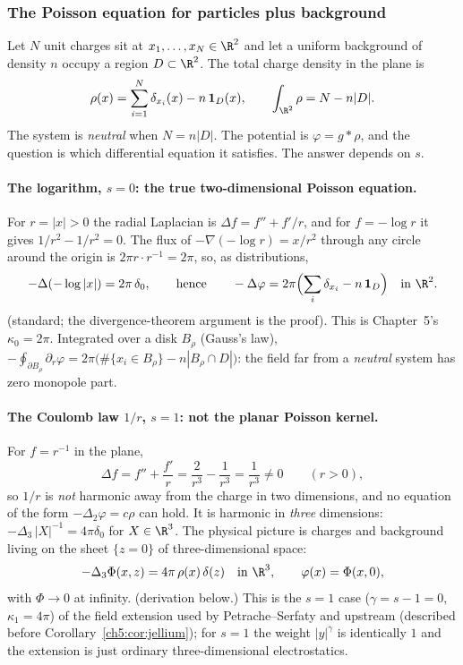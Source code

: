\subsubsection{The Poisson equation for particles plus background}\label{jel:poisson}

Let $N$ unit charges sit at $x_1,\dots,x_N\in\R^2$ and let a uniform background of density $n$ occupy a region
$D\subset\R^2$. The total charge density in the plane is
\begin{equation}\label{jel:eq:rho}
\rho(x)=\sum_{i=1}^N\delta_{x_i}(x)-n\,\mathbf 1_D(x),\qquad \int_{\R^2}\rho=N-n|D| .
\end{equation}
The system is \emph{neutral} when $N=n|D|$. The potential is $\varphi=g*\rho$, and the question is which differential
equation it satisfies. The answer depends on $s$.

\paragraph{The logarithm, $s=0$: the true two-dimensional Poisson equation.} For $r=|x|>0$ the radial Laplacian is
$\Delta f=f''+f'/r$, and for $f=-\log r$ it gives $1/r^2-1/r^2=0$. The flux of $-\nabla(-\log r)=x/r^2$ through any
circle around the origin is $2\pi r\cdot r^{-1}=2\pi$, so, as distributions,
\begin{equation}\label{jel:eq:poisson0}
-\Delta(-\log|x|)=2\pi\,\delta_0,\qquad\text{hence}\qquad
-\Delta\varphi=2\pi\Bigl(\sum_{i}\delta_{x_i}-n\,\mathbf 1_D\Bigr)\quad\text{in }\R^2 .
\end{equation}
\tierC{} (standard; the divergence-theorem argument is the proof). This is Chapter~5's $\kappa_0=2\pi$.
Integrated over a disk $B_\rho$ (Gauss's law), $-\oint_{\partial B_\rho}\partial_r\varphi=2\pi\bigl(\#\{x_i\in
B_\rho\}-n|B_\rho\cap D|\bigr)$: the field far from a \emph{neutral} system has zero monopole part.

\paragraph{The Coulomb law $1/r$, $s=1$: not the planar Poisson kernel.} For $f=r^{-1}$ in the plane,
\[
\Delta f=f''+\frac{f'}r=\frac2{r^3}-\frac1{r^3}=\frac1{r^3}\ne0\qquad(r>0),
\]
so $1/r$ is \emph{not} harmonic away from the charge in two dimensions, and no equation of the form
$-\Delta_2\varphi=c\rho$ can hold. It is harmonic in \emph{three} dimensions: $-\Delta_3\,|X|^{-1}=4\pi\delta_0$ for
$X\in\R^3$. The physical picture is charges and background living on the sheet $\{z=0\}$ of three-dimensional space:
\begin{equation}\label{jel:eq:poisson1}
-\Delta_3\Phi(x,z)=4\pi\,\rho(x)\,\delta(z)\quad\text{in }\R^3,\qquad \varphi(x)=\Phi(x,0),
\end{equation}
with $\Phi\to0$ at infinity. \tierC{} (derivation below.) This is the $s=1$ case ($\gamma=s-1=0$, $\kappa_1=4\pi$) of the
field extension used by Petrache--Serfaty and upstream (described before Corollary~\ref{ch5:cor:jellium}); for $s=1$ the
weight $|y|^\gamma$ is identically $1$ and the extension is just ordinary three-dimensional electrostatics.

